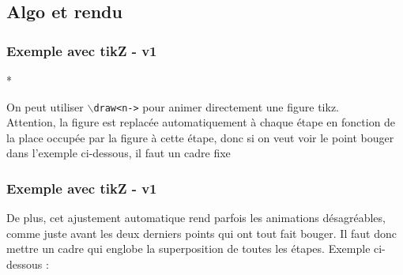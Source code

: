 \subsection{Algo et rendu}
\begin{frame} [fragile]
  \frametitle{Exemple avec tikZ - v1}*
  
  On peut utiliser  \texttt{$\backslash$draw<n->} pour animer directement
  une figure tikz.\\[0.2cm]
  \alert{Attention}, la figure est replacée automatiquement à chaque étape en fonction de la place occupée par la figure à cette étape, donc si on veut voir le point bouger dans l'exemple ci-dessous, il faut un cadre fixe
  \begin{center}
  \end{center}

\end{frame}

\begin{frame} [fragile]
  \frametitle{Exemple avec tikZ - v1}
  
  De plus, cet ajustement automatique rend parfois les animations désagréables,
  comme juste avant les deux derniers points qui ont tout fait bouger.
  Il faut donc mettre un cadre qui englobe la superposition de toutes les étapes.
  Exemple ci-dessous :
  \begin{center}
  \end{center}

\end{frame}
